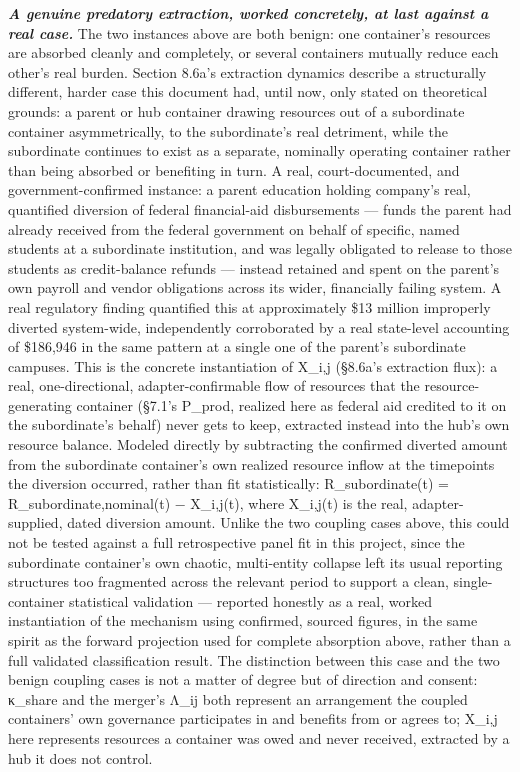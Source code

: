 \documentclass[
]{article}
\begin{document}
\emph{\textbf{A genuine predatory extraction, worked concretely, at last
against a real case.}} The two instances above are both benign: one
container's resources are absorbed cleanly and completely, or several
containers mutually reduce each other's real burden. Section 8.6a's
extraction dynamics describe a structurally different, harder case this
document had, until now, only stated on theoretical grounds: a parent or
hub container drawing resources out of a subordinate container
asymmetrically, to the subordinate's real detriment, while the
subordinate continues to exist as a separate, nominally operating
container rather than being absorbed or benefiting in turn. A real,
court-documented, and government-confirmed instance: a parent education
holding company's real, quantified diversion of federal financial-aid
disbursements --- funds the parent had already received from the federal
government on behalf of specific, named students at a subordinate
institution, and was legally obligated to release to those students as
credit-balance refunds --- instead retained and spent on the parent's
own payroll and vendor obligations across its wider, financially failing
system. A real regulatory finding quantified this at approximately \$13
million improperly diverted system-wide, independently corroborated by a
real state-level accounting of \$186,946 in the same pattern at a single
one of the parent's subordinate campuses. This is the concrete
instantiation of X\_i,j (§8.6a's extraction flux): a real,
one-directional, adapter-confirmable flow of resources that the
resource-generating container (§7.1's P\_prod, realized here as federal
aid credited to it on the subordinate's behalf) never gets to keep,
extracted instead into the hub's own resource balance. Modeled directly
by subtracting the confirmed diverted amount from the subordinate
container's own realized resource inflow at the timepoints the diversion
occurred, rather than fit statistically: R\_subordinate(t) =
R\_subordinate,nominal(t) − X\_i,j(t), where X\_i,j(t) is the real,
adapter-supplied, dated diversion amount. Unlike the two coupling cases
above, this could not be tested against a full retrospective panel fit
in this project, since the subordinate container's own chaotic,
multi-entity collapse left its usual reporting structures too fragmented
across the relevant period to support a clean, single-container
statistical validation --- reported honestly as a real, worked
instantiation of the mechanism using confirmed, sourced figures, in the
same spirit as the forward projection used for complete absorption
above, rather than a full validated classification result. The
distinction between this case and the two benign coupling cases is not a
matter of degree but of direction and consent: κ\_share and the merger's
Λ\_ij both represent an arrangement the coupled containers' own
governance participates in and benefits from or agrees to; X\_i,j here
represents resources a container was owed and never received, extracted
by a hub it does not control.
\end{document}
